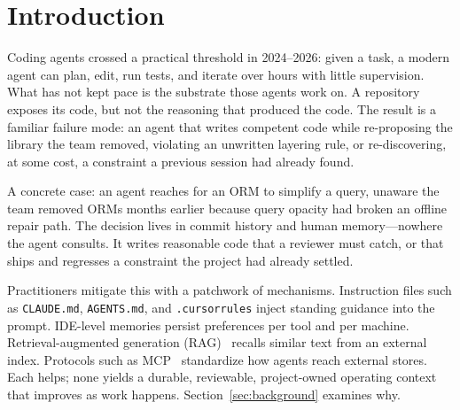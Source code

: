 \documentclass[sigconf,review]{acmart}
\begin{document}
\maketitle

\section{Introduction}
Coding agents crossed a practical threshold in 2024--2026: given a task, a modern agent can plan, edit, run tests, and iterate over hours with little supervision. What has not kept pace is the substrate those agents work on. A repository exposes its code, but not the reasoning that produced the code. The result is a familiar failure mode: an agent that writes competent code while re-proposing the library the team removed, violating an unwritten layering rule, or re-discovering, at some cost, a constraint a previous session had already found.

A concrete case: an agent reaches for an ORM to simplify a query, unaware the team removed ORMs months earlier because query opacity had broken an offline repair path. The decision lives in commit history and human memory---nowhere the agent consults. It writes reasonable code that a reviewer must catch, or that ships and regresses a constraint the project had already settled.

Practitioners mitigate this with a patchwork of mechanisms. Instruction files such as \texttt{CLAUDE.md}, \texttt{AGENTS.md}, and \texttt{.cursorrules} inject standing guidance into the prompt. IDE-level memories persist preferences per tool and per machine. Retrieval-augmented generation (RAG)~\cite{lewis2020rag} recalls similar text from an external index. Protocols such as MCP~\cite{mcp2024} standardize how agents reach external stores. Each helps; none yields a durable, reviewable, project-owned operating context that improves as work happens. Section~\ref{sec:background} examines why.
\end{document}
